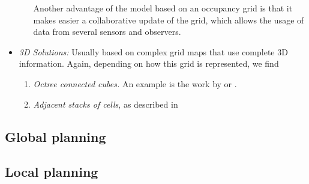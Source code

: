 \begin{itemize}
\begin{enumerate}
   Another advantage of the model based on an occupancy grid is that it makes easier a collaborative update of the grid, which allows the usage of data from several sensors and observers.
  \end{enumerate} 
 \item \emph{3D Solutions:} Usually based on complex grid maps that use complete 3D information. Again, depending on how this grid is represented, we find 
 \begin{enumerate}
   \item \emph{Octree connected cubes.} An example is the work by \cite{wurm2010octomap} or \cite{broggi2013}.
   \item \emph{Adjacent stacks of cells}, as described in \cite{Moravec96robotspatial} 
 \end{enumerate}
\end{itemize}

\subsection{Global planning}\label{ch:chapter01_02_06}

% 
% 
% 



\subsection{Local planning}\label{ch:chapter01_02_03}


